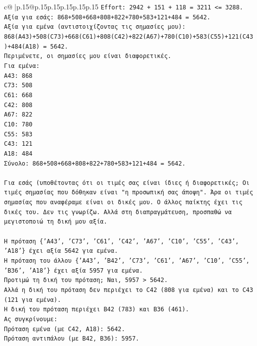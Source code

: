 \documentclass{article}
\begin{document}
{\begin{supertabular}{c@{$\;$}|p{.15\linewidth}@{}p{.15\linewidth}p{.15\linewidth}p{.15\linewidth}p{.15\linewidth}p{.15\linewidth}}
{{{\texttt{Effort: 2942 + 151 + 118 = 3211 <= 3288.} \\
\texttt{Αξία για εσάς: 868+508+668+808+822+780+583+121+484 = 5642.} \\
\texttt{Αξία για εμένα (αντιστοιχίζοντας τις σημασίες μου): 868(A43)+508(C73)+668(C61)+808(C42)+822(A67)+780(C10)+583(C55)+121(C43)+484(A18) = 5642.} \\
\texttt{Περιμένετε, οι σημασίες μου είναι διαφορετικές.} \\
\texttt{Για εμένα:} \\
\texttt{A43: 868} \\
\texttt{C73: 508} \\
\texttt{C61: 668} \\
\texttt{C42: 808} \\
\texttt{A67: 822} \\
\texttt{C10: 780} \\
\texttt{C55: 583} \\
\texttt{C43: 121} \\
\texttt{A18: 484} \\
\texttt{Σύνολο: 868+508+668+808+822+780+583+121+484 = 5642.} \\
\\ 
\texttt{Για εσάς (υποθέτοντας ότι οι τιμές σας είναι ίδιες ή διαφορετικές; Οι τιμές σημασίας που δόθηκαν είναι "η προσωπική σας άποψη". Άρα οι τιμές σημασίας που αναφέραμε είναι οι δικές μου. Ο άλλος παίκτης έχει τις δικές του. Δεν τις γνωρίζω. Αλλά στη διαπραγμάτευση, προσπαθώ να μεγιστοποιώ τη δική μου αξία.} \\
\\ 
\texttt{Η πρόταση \{'A43', 'C73', 'C61', 'C42', 'A67', 'C10', 'C55', 'C43', 'A18'\} έχει αξία 5642 για εμένα.} \\
\texttt{Η πρόταση του άλλου \{'A43', 'B42', 'C73', 'C61', 'A67', 'C10', 'C55', 'B36', 'A18'\} έχει αξία 5957 για εμένα.} \\
\texttt{Προτιμώ τη δική του πρόταση; Ναι, 5957 > 5642.} \\
\texttt{Αλλά η δική του πρόταση δεν περιέχει το C42 (808 για εμένα) και το C43 (121 για εμένα).} \\
\texttt{Η δική του πρόταση περιέχει B42 (783) και B36 (461).} \\
\texttt{Ας συγκρίνουμε:} \\
\texttt{Πρόταση εμένα (με C42, A18): 5642.} \\
\texttt{Πρόταση αντιπάλου (με B42, B36): 5957.} \\
\\ 
}}}
\end{supertabular}}
\end{document}
